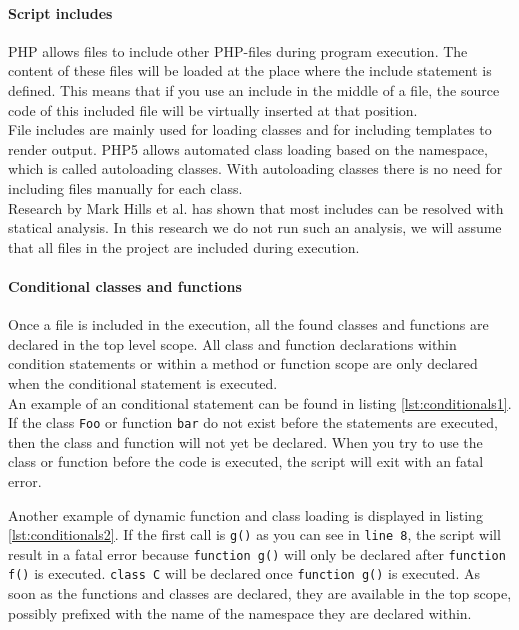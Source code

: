 \documentclass[../main.tex]{subfiles}
\begin{document}
    \paragraph{Script includes}
    PHP allows files to include other PHP-files during program execution. 
    The content of these files will be loaded at the place where the include statement is defined. 
    This means that if you use an include in the middle of a file, the source code of this included file will be virtually inserted at that position.
    \\
    File includes are mainly used for loading classes and for including templates to render output.
    PHP5 allows automated class loading based on the namespace, which is called autoloading classes.
    With autoloading classes there is no need for including files manually for each class.
    \\
    Research by Mark Hills et al.\cite{Hil:14} has shown that most includes can be resolved with statical analysis.
    In this research we do not run such an analysis, we will assume that all files in the project are included during execution.
    
    \paragraph{Conditional classes and functions}
    Once a file is included in the execution, all the found classes and functions are declared in the top level scope.
    All class and function declarations within condition statements or within a method or function scope are only declared when the conditional statement  is executed.
    \\
    An example of an conditional statement can be found in listing \ref{lst:conditionals1}.
    If the class \texttt{Foo} or function \texttt{bar} do not exist before the statements are executed, then the class and function will not yet be declared. 
    When you try to use the class or function before the code is executed, the script will exit with an fatal error.

    

    Another example of dynamic function and class loading is displayed in listing \ref{lst:conditionals2}.
    If the first call is \texttt{g()} as you can see in \texttt{line 8}, the script will result in a fatal error because \texttt{function g()} will only be declared after \texttt{function f()} is executed.
    \texttt{class C} will be declared once \texttt{function g()} is executed.
    As soon as the functions and classes are declared, they are available in the top scope, possibly prefixed with the name of the namespace they are declared within.
    
\end{document}
